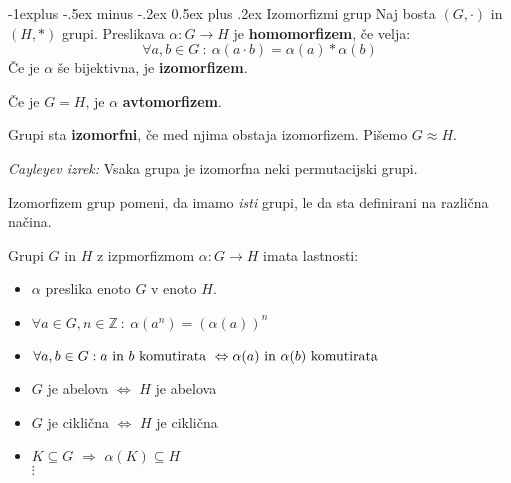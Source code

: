 \documentclass[a4paper,9pt]{extarticle}
\makeatletter
\renewcommand{\subsection}{\@startsection{subsection}{2}{0mm}%
                                {-1explus -.5ex minus -.2ex}%
                                {0.5ex plus .2ex}%
                                {\normalfont\normalsize\bfseries}}
\makeatother
\begin{document}
\begin{multicols}{3}
\subsection{Izomorfizmi grup}
Naj bosta $(G, \cdot )$ in $(H, *)$ grupi. Preslikava $\alpha : G \to H$ je \textbf{homomorfizem}, če velja:
\[ \forall a, b  \in G\ :\ \alpha(a \cdot b) = \alpha(a) * \alpha(b) \]
Če je $\alpha$ še bijektivna, je \textbf{izomorfizem}.

Če je $G = H$, je $\alpha$ \textbf{avtomorfizem}.

Grupi sta \textbf{izomorfni}, če med njima obstaja izomorfizem. Pišemo $G \approx H$.

\emph{Cayleyev izrek:} Vsaka grupa je izomorfna neki permutacijski grupi.

Izomorfizem grup pomeni, da imamo \emph{isti} grupi, le da sta definirani na različna načina.

Grupi $G$ in $H$ z izpmorfizmom $\alpha: G \to H$ imata lastnosti:
\begin{itemize}
    \item $\alpha$ preslika enoto $G$ v enoto $H$.
    \item $\forall a \in G, n \in \mathbb{Z}\ :\ \alpha(a^n) = \left( \alpha(a) \right)^n$
    \item $\forall a,b \in G : a \textmd{ in } b \textmd{ komutirata } \Leftrightarrow \alpha(a) \textmd{ in } \alpha(b) \textmd{ komutirata }$
    \item $G$ je abelova $\Leftrightarrow$ $H$ je abelova
    \item $G$ je ciklična $\Leftrightarrow$ $H$ je ciklična
    \item $K \subseteq G$ $\Rightarrow$ $\alpha(K) \subseteq H$\\
    $\vdots$
\end{itemize}



\end{multicols}
\end{document}

